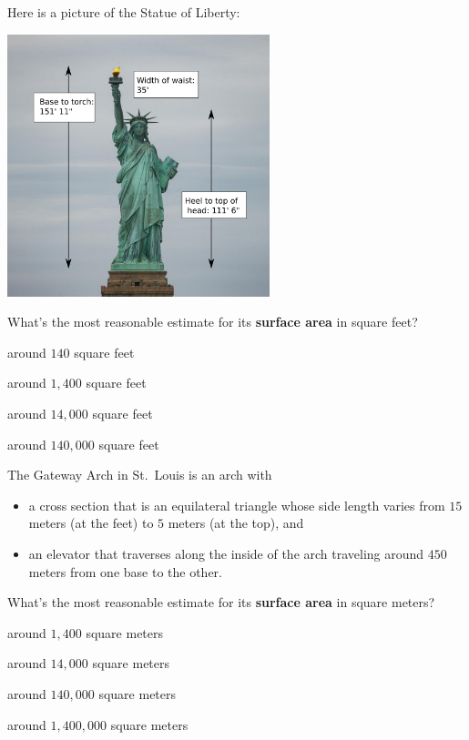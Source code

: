 \documentclass[noauthor,nooutcomes]{ximera}
\begin{document}
\begin{exercise}
  Here is a picture of the Statue of Liberty:
  \begin{center}
    \includegraphics[width=3in]{statueLiberty.png}
  \end{center}
  What's the most reasonable estimate for its \textbf{surface area} in square feet?
  \begin{enumerate}\begin{multicols}{2}
    \item around $140$ square feet
    \item around $1,400$ square feet
    \item around $14,000$ square feet
    \item around $140,000$ square feet
    \end{multicols}
  \end{enumerate}
\end{exercise}



\begin{exercise}
 The Gateway Arch in St.\ Louis is an arch with
\begin{itemize}
\item a cross section that is an equilateral triangle whose side
  length varies from $15$ meters (at the feet) to $5$ meters (at the
  top), and
\item an elevator that traverses along the inside of the arch
  traveling around $450$ meters from one base to the other.
\end{itemize}
What's the most reasonable estimate for its \textbf{surface area} in square meters?
\begin{enumerate}\begin{multicols}{2}
  \item around $1,400$ square meters
  \item around $14,000$ square meters
  \item around $140,000$ square meters
  \item around $1,400,000$ square meters
  \end{multicols}
  \end{enumerate}
\end{exercise}





\end{document}
